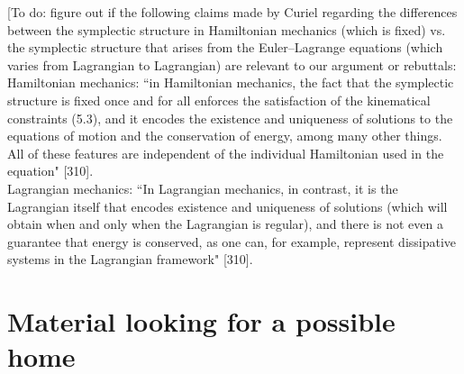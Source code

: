 \documentclass[letterpaper]{article}
\begin{document}
[To do: figure out if the following claims made by Curiel regarding the differences between the symplectic structure in Hamiltonian mechanics (which is fixed) vs. the symplectic structure that arises from the Euler--Lagrange equations (which varies from Lagrangian to Lagrangian) are relevant to our argument or rebuttals: \\ 
Hamiltonian mechanics: ``in Hamiltonian mechanics, the fact that the symplectic structure is fixed once and for all enforces the satisfaction of the kinematical constraints (5.3), and it encodes the existence and uniqueness of solutions to the equations of motion and the conservation of energy, among many other things. All of these features are independent of the individual Hamiltonian used in the equation" [310]. \\
Lagrangian mechanics: ``In Lagrangian mechanics, in contrast, it is the Lagrangian itself that encodes existence and uniqueness of solutions (which will obtain when and only when the Lagrangian is regular), and there is not even a guarantee that energy is conserved, as one can, for example, represent dissipative systems in the Lagrangian framework" [310].












\section{Material looking for a possible home}
\end{document}
